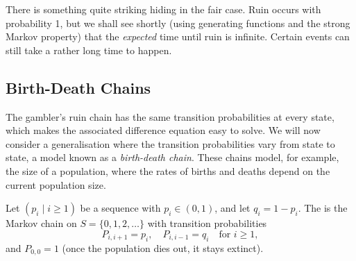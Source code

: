 \documentclass[a4paper]{scrartcl}
\begin{document}
\begin{remark}
	There is something quite striking hiding in the fair case. Ruin occurs with probability 1, but we shall see shortly (using generating functions and the strong Markov property) that the \emph{expected} time until ruin is infinite. Certain events can still take a rather long time to happen.
\end{remark}

\subsection{Birth-Death Chains}

The gambler's ruin chain has the same transition probabilities at every state, which makes the associated difference equation easy to solve. We will now consider a generalisation where the transition probabilities vary from state to state, a model known as a \emph{birth-death chain}. These chains model, for example, the size of a population, where the rates of births and deaths depend on the current population size.

Let $(p_i \mid i \geq 1)$ be a sequence with $p_i \in (0, 1)$, and let $q_i = 1 - p_i$. The  is the Markov chain on $S = \{0, 1, 2, \dots\}$ with transition probabilities
$$
P_{i, i + 1} = p_i, \quad P_{i, i - 1} = q_i \quad \text{for } i \geq 1,
$$
and $P_{0, 0} = 1$ (once the population dies out, it stays extinct).

\begin{center}
	\end{center}
\end{document}
